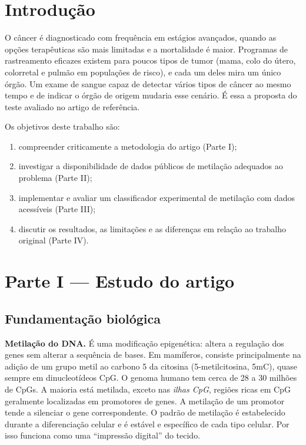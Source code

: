 \documentclass[11pt,a4paper]{article}
\providecommand{\tightlist}{\setlength{\itemsep}{0pt}\setlength{\parskip}{0pt}}
\begin{document}
\section{Introdução}

O câncer é diagnosticado com frequência em estágios avançados, quando as opções
terapêuticas são mais limitadas e a mortalidade é maior. Programas de
rastreamento eficazes existem para poucos tipos de tumor (mama, colo do útero,
colorretal e pulmão em populações de risco), e cada um deles mira um único
órgão. Um exame de sangue capaz de detectar vários tipos de câncer ao mesmo
tempo e de indicar o órgão de origem mudaria esse cenário. É essa a proposta do
teste avaliado no artigo de referência.

Os objetivos deste trabalho são:

\begin{enumerate}
\def\labelenumi{\arabic{enumi}.}
\tightlist
\item
  compreender criticamente a metodologia do artigo (Parte I);
\item
  investigar a disponibilidade de dados públicos de metilação adequados ao
  problema (Parte II);
\item
  implementar e avaliar um classificador experimental de metilação com dados
  acessíveis (Parte III);
\item
  discutir os resultados, as limitações e as diferenças em relação ao trabalho
  original (Parte IV).
\end{enumerate}

\section{Parte I --- Estudo do artigo}

\subsection{Fundamentação biológica}

\textbf{Metilação do DNA.} É uma modificação epigenética: altera a regulação dos
genes sem alterar a sequência de bases. Em mamíferos, consiste principalmente na
adição de um grupo metil ao carbono 5 da citosina (5-metilcitosina, 5mC), quase
sempre em dinucleotídeos CpG. O genoma humano tem cerca de 28 a 30 milhões de
CpGs. A maioria está metilada, exceto nas \emph{ilhas CpG}, regiões ricas em CpG
geralmente localizadas em promotores de genes. A metilação de um promotor tende
a silenciar o gene correspondente. O padrão de metilação é estabelecido durante
a diferenciação celular e é estável e específico de cada tipo celular. Por isso
funciona como uma ``impressão digital'' do tecido.
\end{document}
